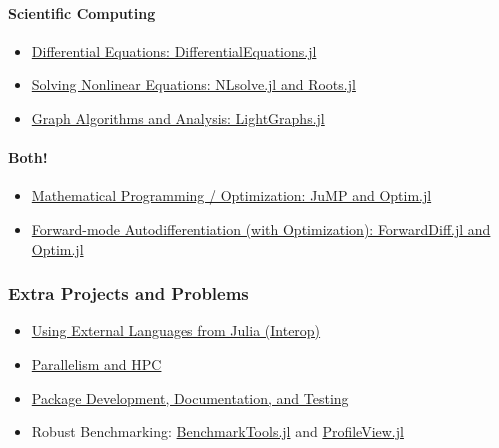 \documentclass[11pt]{article}
\providecommand{\tightlist}{%
      \setlength{\itemsep}{0pt}\setlength{\parskip}{0pt}}
\begin{document}
\paragraph{Scientific Computing}\label{scientific-computing}

\begin{itemize}
\tightlist
\item
  \href{http://ucidatascienceinitiative.github.io/IntroToJulia/Html/DiffEq}{Differential
  Equations: DifferentialEquations.jl}
\item
  \href{http://ucidatascienceinitiative.github.io/IntroToJulia/Html/NonlinearSolve}{Solving
  Nonlinear Equations: NLsolve.jl and Roots.jl}
\item
  \href{http://ucidatascienceinitiative.github.io/IntroToJulia/Html/Graphs}{Graph
  Algorithms and Analysis: LightGraphs.jl}
\end{itemize}

\paragraph{Both!}\label{both}

\begin{itemize}
\tightlist
\item
  \href{http://ucidatascienceinitiative.github.io/IntroToJulia/Html/Optimization}{Mathematical
  Programming / Optimization: JuMP and Optim.jl}
\item
  \href{http://ucidatascienceinitiative.github.io/IntroToJulia/Html/ForwardDiff}{Forward-mode
  Autodifferentiation (with Optimization): ForwardDiff.jl and Optim.jl}
\end{itemize}

\subsubsection{Extra Projects and
Problems}\label{extra-projects-and-problems}

\begin{itemize}
\tightlist
\item
  \href{http://ucidatascienceinitiative.github.io/IntroToJulia/Html/Interop}{Using
  External Languages from Julia (Interop)}
\item
  \href{http://ucidatascienceinitiative.github.io/IntroToJulia/Html/HPCJulia}{Parallelism
  and HPC}
\item
  \href{http://ucidatascienceinitiative.github.io/IntroToJulia/Html/PackageDevelopment}{Package
  Development, Documentation, and Testing}
\item
  Robust Benchmarking:
  \href{https://github.com/JuliaCI/BenchmarkTools.jl}{BenchmarkTools.jl}
  and \href{https://github.com/timholy/ProfileView.jl}{ProfileView.jl}
\end{itemize}
\end{document}
